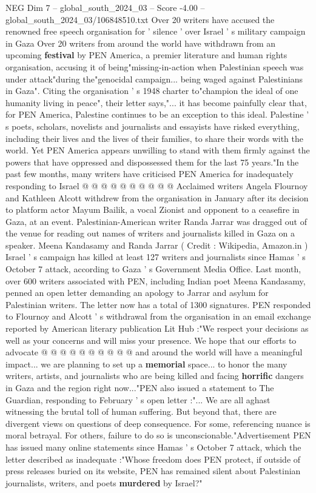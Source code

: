 \begin{textsample}{NEG Dim 7 – global\_south\_2024\_03 – Score -4.00 – global\_south\_2024\_03/106848510.txt}  \label{ex:f7_neg_424}
Over 20 writers have accused the renowned free speech organisation for ' silence ' over Israel ' s military campaign in Gaza Over 20 writers from around the world have withdrawn from an upcoming \textbf{festival} by PEN America, a premier literature and human rights organisation, accusing it of being"missing-in-action when Palestinian speech was under attack"during the"genocidal campaign... being waged against Palestinians in Gaza".
Citing the organisation ' s 1948 charter to"champion the ideal of one humanity living in peace", their letter says,"... it has become painfully clear that, for PEN America, Palestine continues to be an exception to this ideal.
Palestine ' s poets, scholars, novelists and journalists and essayists have risked everything, including their lives and the lives of their families, to share their words with the world.
Yet PEN America appears unwilling to stand with them firmly against the powers that have oppressed and dispossessed them for the last 75 years."In the past few months, many writers have criticised PEN America for inadequately responding to Israel @ @ @ @ @ @ @ @ @ @ Acclaimed writers Angela Flournoy and Kathleen Alcott withdrew from the organisation in January after its decision to platform actor Mayum Bailik, a vocal Zionist and opponent to a ceasefire in Gaza, at an event.
Palestinian-American writer Randa Jarrar was dragged out of the venue for reading out names of writers and journalists killed in Gaza on a speaker.
Meena Kandasamy and Randa Jarrar ( Credit : Wikipedia, Amazon.in ) Israel ' s campaign has killed at least 127 writers and journalists since Hamas ' s October 7 attack, according to Gaza ' s Government Media Office.
Last month, over 600 writers associated with PEN, including Indian poet Meena Kandasamy, penned an open letter demanding an apology to Jarrar and asylum for Palestinian writers.
The letter now has a total of 1300 signatures.
PEN responded to Flournoy and Alcott ' s withdrawal from the organisation in an email exchange reported by American literary publication Lit Hub :"We respect your decisions as well as your concerns and will miss your presence.
We hope that our efforts to advocate @ @ @ @ @ @ @ @ @ @ and around the world will have a meaningful impact... we are planning to set up a \textbf{memorial} space... to honor the many writers, artists, and journalists who are being killed and facing \textbf{horrific} dangers in Gaza and the region right now..."PEN also issued a statement to The Guardian, responding to February ' s open letter :"...
We are all aghast witnessing the brutal toll of human suffering.
But beyond that, there are divergent views on questions of deep consequence.
For some, referencing nuance is moral betrayal.
For others, failure to do so is unconscionable."Advertisement PEN has issued many online statements since Hamas ' s October 7 attack, which the letter described as inadequate :"Whose freedom does PEN protect, if outside of press releases buried on its website, PEN has remained silent about Palestinian journalists, writers, and poets \textbf{murdered} by Israel?"

\end{textsample}
